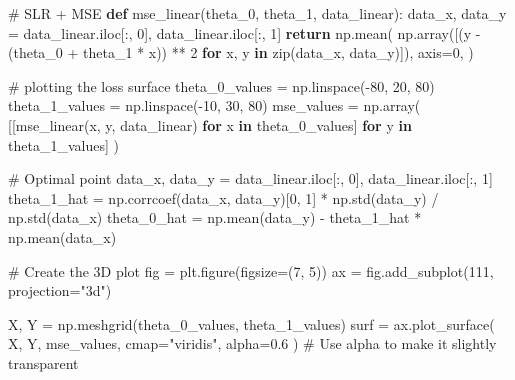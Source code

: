 \documentclass[
  letterpaper,
  DIV=11,
  numbers=noendperiod]{scrreprt}
\newenvironment{Shaded}{\begin{snugshade}}{\end{snugshade}}
\newcommand{\BuiltInTok}[1]{\textcolor[rgb]{0.00,0.23,0.31}{#1}}
\newcommand{\CommentTok}[1]{\textcolor[rgb]{0.37,0.37,0.37}{#1}}
\newcommand{\ControlFlowTok}[1]{\textcolor[rgb]{0.00,0.23,0.31}{\textbf{#1}}}
\newcommand{\DecValTok}[1]{\textcolor[rgb]{0.68,0.00,0.00}{#1}}
\newcommand{\FloatTok}[1]{\textcolor[rgb]{0.68,0.00,0.00}{#1}}
\newcommand{\KeywordTok}[1]{\textcolor[rgb]{0.00,0.23,0.31}{\textbf{#1}}}
\newcommand{\NormalTok}[1]{\textcolor[rgb]{0.00,0.23,0.31}{#1}}
\newcommand{\OperatorTok}[1]{\textcolor[rgb]{0.37,0.37,0.37}{#1}}
\newcommand{\StringTok}[1]{\textcolor[rgb]{0.13,0.47,0.30}{#1}}
\begin{document}
\begin{Shaded}
\begin{Highlighting}[]
\CommentTok{\# SLR + MSE}
\KeywordTok{def}\NormalTok{ mse\_linear(theta\_0, theta\_1, data\_linear):}
\NormalTok{    data\_x, data\_y }\OperatorTok{=}\NormalTok{ data\_linear.iloc[:, }\DecValTok{0}\NormalTok{], data\_linear.iloc[:, }\DecValTok{1}\NormalTok{]}
    \ControlFlowTok{return}\NormalTok{ np.mean(}
\NormalTok{        np.array([(y }\OperatorTok{{-}}\NormalTok{ (theta\_0 }\OperatorTok{+}\NormalTok{ theta\_1 }\OperatorTok{*}\NormalTok{ x)) }\OperatorTok{**} \DecValTok{2} \ControlFlowTok{for}\NormalTok{ x, y }\KeywordTok{in} \BuiltInTok{zip}\NormalTok{(data\_x, data\_y)]),}
\NormalTok{        axis}\OperatorTok{=}\DecValTok{0}\NormalTok{,}
\NormalTok{    )}


\CommentTok{\# plotting the loss surface}
\NormalTok{theta\_0\_values }\OperatorTok{=}\NormalTok{ np.linspace(}\OperatorTok{{-}}\DecValTok{80}\NormalTok{, }\DecValTok{20}\NormalTok{, }\DecValTok{80}\NormalTok{)}
\NormalTok{theta\_1\_values }\OperatorTok{=}\NormalTok{ np.linspace(}\OperatorTok{{-}}\DecValTok{10}\NormalTok{, }\DecValTok{30}\NormalTok{, }\DecValTok{80}\NormalTok{)}
\NormalTok{mse\_values }\OperatorTok{=}\NormalTok{ np.array(}
\NormalTok{    [[mse\_linear(x, y, data\_linear) }\ControlFlowTok{for}\NormalTok{ x }\KeywordTok{in}\NormalTok{ theta\_0\_values] }\ControlFlowTok{for}\NormalTok{ y }\KeywordTok{in}\NormalTok{ theta\_1\_values]}
\NormalTok{)}

\CommentTok{\# Optimal point}
\NormalTok{data\_x, data\_y }\OperatorTok{=}\NormalTok{ data\_linear.iloc[:, }\DecValTok{0}\NormalTok{], data\_linear.iloc[:, }\DecValTok{1}\NormalTok{]}
\NormalTok{theta\_1\_hat }\OperatorTok{=}\NormalTok{ np.corrcoef(data\_x, data\_y)[}\DecValTok{0}\NormalTok{, }\DecValTok{1}\NormalTok{] }\OperatorTok{*}\NormalTok{ np.std(data\_y) }\OperatorTok{/}\NormalTok{ np.std(data\_x)}
\NormalTok{theta\_0\_hat }\OperatorTok{=}\NormalTok{ np.mean(data\_y) }\OperatorTok{{-}}\NormalTok{ theta\_1\_hat }\OperatorTok{*}\NormalTok{ np.mean(data\_x)}

\CommentTok{\# Create the 3D plot}
\NormalTok{fig }\OperatorTok{=}\NormalTok{ plt.figure(figsize}\OperatorTok{=}\NormalTok{(}\DecValTok{7}\NormalTok{, }\DecValTok{5}\NormalTok{))}
\NormalTok{ax }\OperatorTok{=}\NormalTok{ fig.add\_subplot(}\DecValTok{111}\NormalTok{, projection}\OperatorTok{=}\StringTok{"3d"}\NormalTok{)}

\NormalTok{X, Y }\OperatorTok{=}\NormalTok{ np.meshgrid(theta\_0\_values, theta\_1\_values)}
\NormalTok{surf }\OperatorTok{=}\NormalTok{ ax.plot\_surface(}
\NormalTok{    X, Y, mse\_values, cmap}\OperatorTok{=}\StringTok{"viridis"}\NormalTok{, alpha}\OperatorTok{=}\FloatTok{0.6}
\NormalTok{)  }\CommentTok{\# Use alpha to make it slightly transparent}


\end{Highlighting}
\end{Shaded}
\end{document}
